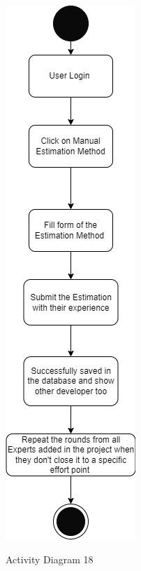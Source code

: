 \begin{figure}[H]
    \centering
    \caption{Activity Diagram 18}
    \includegraphics[scale=0.5]{./diagrams/Activity Diagram/ad-18.png}
    \label{fig:act-18}

\end{figure}


